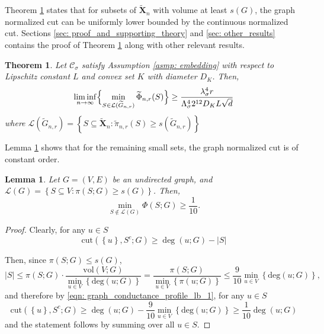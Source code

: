 \documentclass{article}
\newcommand{\abs}[1]{\left \lvert #1 \right \rvert}
\newcommand{\set}[1]{\left\{#1\right\}}
\newcommand{\Xbf}{\mathbf{X}}
\newcommand{\Cset}{\mathcal{C}}
\newcommand{\Csig}{\Cset_{\sigma}}
\newcommand{\1}{\mathbf{1}}
\newcommand{\cut}{\mathrm{cut}}
\newcommand{\vol}{\mathrm{vol}}
\theoremstyle{alden}
\theoremstyle{aldenthm}
\newtheorem{theorem}{Theorem}
\newtheorem{lemma}{Lemma}
\theoremstyle{remark}
\begin{document}
Theorem \ref{thm: graph_conductance_profile_lb_1} states that for subsets of $\widetilde{\Xbf}_n$ with volume at least $s(G)$, the graph normalized cut can be uniformly lower bounded by the continuous normalized cut. Sections \ref{sec: proof_and_supporting_theory} and \ref{sec: other_results} contains the proof of Theorem \ref{thm: graph_conductance_profile_lb_1} along with other relevant results.

\begin{theorem}
	\label{thm: graph_conductance_profile_lb_1}
	Let $\Csig$ satisfy Assumption \ref{asmp: embedding} with respect to Lipschitz constant $L$ and convex set $K$ with diameter $D_K$. Then,
	\begin{equation*}
	\liminf_{n \to \infty} \Bigl\{ \min_{S \in \mathcal{L}(\widetilde{G}_{n,r})} \widetilde{\Phi}_{n,r}(S) \Bigr\} \geq \frac{\lambda_{\sigma}^4 r}{\Lambda_{\sigma}^4 2^{12} D_K L \sqrt{d}}
	\end{equation*}
	where $\mathcal{L}(\widetilde{G}_{n,r}) = \set{S \subseteq \widetilde{\Xbf}_n: \widetilde{\pi}_{n,r}(S) \geq s(\widetilde{G}_{n,r})}$
\end{theorem}

Lemma \ref{lem: graph_conductance_profile_lb_1} shows that for the remaining small sets, the graph normalized cut is of constant order. 
\begin{lemma}
	\label{lem: graph_conductance_profile_lb_1}
	Let $G = (V,E)$ be an undirected graph, and $\mathcal{L}(G) = \set{S \subseteq V: \pi(S; G) \geq s(G)}$. Then,
	\begin{equation*}
	\min_{S \not\in \mathcal{L}(G)}\Phi(S; G) \geq \frac{1}{10}.
	\end{equation*}
\end{lemma}
\begin{proof}
	Clearly, for any $u \in S$
	\begin{equation}
	\label{eqn: graph_conductance_profile_lb_1}
	\cut(\set{u}, S^c; G) \geq \deg(u;G) - \abs{S}
	\end{equation}
	
	Then, since $\pi(S;G) \leq s(G)$,
	\begin{equation*}
	\abs{S} \leq \pi(S;G) \cdot \frac{\vol(V;G)}{\min_{u \in V} \set{\mathrm{deg}(u;G)}} = \frac{\pi(S;G)}{\min_{u \in V} \set{\pi(u;G)}} \leq \frac{9}{10} \min_{u \in V} \set{\mathrm{deg}(u;G)},
	\end{equation*}
	and therefore by \eqref{eqn: graph_conductance_profile_lb_1}, for any $u \in S$
	\begin{equation*}
	\cut(\set{u}, S^c; G) \geq \deg(u;G) - \frac{9}{10} \min_{u \in V} \set{\mathrm{deg}(u;G)} \geq \frac{1}{10}\deg(u;G)
	\end{equation*}
	and the statement follows by summing over all $u \in S$. 
\end{proof}
\end{document}
